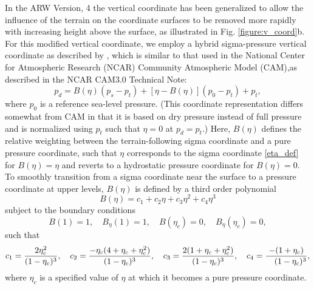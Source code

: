 In the ARW Version, 4 the vertical coordinate has been generalized to allow the
influence of the terrain on the coordinate surfaces to be removed more rapidly
with increasing height above the surface, as illustrated in Fig. \ref{figure:v_coord}b. For this modified  vertical coordinate, we employ a hybrid sigma-pressure vertical coordinate as described by \citet{park13}, which is similar to that used in the National Center for Atmospheric Research (NCAR) Community Atmospheric Model (CAM),as described in the NCAR CAM3.0 Technical Note:
%
\begin{equation}
p_d = B(\eta)(p_{s}-p_t) + [\eta-B(\eta)](p_0-{p_t})+p_t,          
\label{hyb_def}
 \end{equation}
%
where $p_0$ is a reference sea-level pressure. (This coordinate representation differs somewhat from CAM in that it is based on dry pressure instead of full pressure and is normalized using $p_t$ such that $\eta=0$ at $p_d = p_t$.) Here, $B(\eta)$ defines the relative weighting between the terrain-following sigma coordinate and a pure pressure coordinate, such that $\eta$ corresponds to the sigma coordinate \eqref{eta_def} for $B(\eta) = \eta$ and reverts to a hydrostatic pressure coordinate for $B(\eta) = 0$. To smoothly transition from a sigma coordinate near the surface to a pressure coordinate at upper levels, $B(\eta)$ is defined by a third order polynomial
%
\begin{equation}
B(\eta) = c_1+c_2\eta+c_3\eta^2+c_4\eta^3         
\label{B_def}
 \end{equation}
%
subject to the boundary conditions
%
\begin{equation}
B(1)=1,\quad B_\eta(1)=1, \quad B(\eta_c)=0, \quad B_\eta(\eta_c)=0,         
\label{B_bc}
 \end{equation}
%
such that
%
\begin{equation}
c_1={2\eta_c^2\over(1-\eta_c)^3},  \quad      
c_2={-\eta_c(4+\eta_c+\eta_c^2)\over(1-\eta_c)^3},  \quad      
c_3={2(1+\eta_c+\eta_c^2)\over(1-\eta_c)^3},  \quad      
c_4={-(1+\eta_c)\over\ \ \ (1-\eta_c)^3},    
\label{B_cof}
 \end{equation}
where $\eta_c$ is a specified value of $\eta$ at which it becomes a pure pressure coordinate.%
%
